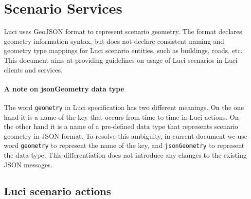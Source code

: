\section{Scenario Services}
\label{ch:scenarios}

\ac{Luci} uses GeoJSON format to represent scenario geometry.
The format declares geometry information syntax, but does not declare consistent naming and geometry type mappings for \ac{Luci} scenario entities, such as buildings, roads, etc.
This document aims at providing guidelines on usage of \ac{Luci} scenarios in \ac{Luci} clients and services.

\paragraph{A note on jsonGeometry data type}
The word \texttt{geometry} in \ac{Luci} specification has two different meanings.
On the one hand it is a name of the key that occurs from time to time in \ac{Luci} actions.
On the other hand it is a name of a pre-defined data type that represents scenario geometry in JSON format.
To resolve this ambiguity, in current document we use word \texttt{geometry} to represent the name of the key, and \texttt{\color{blue}jsonGeometry} to represent the data type.
This differentiation does not introduce any changes to the existing JSON messages.

\subsection{\acs{Luci} scenario actions}
\label{ch:scenarios:actions}


